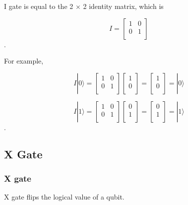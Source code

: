 I gate is equal to the 2 $\times$ 2 identity matrix, which is 

\begin{equation}
I = \begin{bmatrix}
1 & 0 \\
0 & 1 \\
\end{bmatrix}
\end{equation}.

For example,

\begin{equation}
 I|0\rangle = \begin{bmatrix}
1 & 0 \\
0 & 1 \\
\end{bmatrix} 
\left[
\begin{array}{c}
1 \\
0 \\
\end{array}
\right]
= \left[
\begin{array}{c}
1 \\
0 \\
\end{array}
\right]
= |0\rangle
\end{equation}

\begin{equation}
I|1\rangle = \begin{bmatrix}
1 & 0 \\
0 & 1 \\
\end{bmatrix} 
\left[
\begin{array}{c}
0 \\
1  \\
\end{array}
\right]
= \left[
\begin{array}{c}
0 \\
1 \\
\end{array}
\right]
= |1\rangle
\end{equation}.

\subsection{X Gate}
\subsubsection{X gate}

X gate flips the logical value of a qubit.

